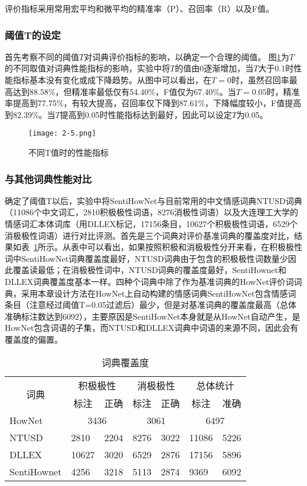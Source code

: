 评价指标采用常用宏平均和微平均的精准率（P）、召回率（R）以及F值。
\subsubsection{阈值T的设定}
首先考察不同的阈值$ T $对词典评价指标的影响，以确定一个合理的阈值。
图\ref{fig2-5}为$ T $的不同取值对词典性能指标的影响，实验中将$ T $的值由0逐渐增加，当$ T $大于0.1时性能指标基本没有变化或成下降趋势。从图中可以看出，在$ T=0 $时，虽然召回率最高达到88.58\%，但精准率最低仅有54.40\%，F值仅为67.40\%。当$ T=0.05 $时，精准率提高到77.75\%，有较大提高，召回率仅下降到87.61\%，下降幅度较小，F值提高到82.39\%。当$ T $提高到0.05时性能指标达到最好，因此可以设定$ T $为0.05。

\begin{figure}[htp]
\centering
\texttt{[image: 2-5.png]}
\caption{不同T值时的性能指标}
\label{fig2-5}
\end{figure}

\subsubsection{与其他词典性能对比}
确定了阈值T以后，实验中将SentiHowNet与目前常用的中文情感词典NTUSD词典（11086个中文词汇，2810积极极性词语，8276消极性词语）以及大连理工大学的情感词汇本体词库（用DLLEX标记，17156条目，10627个积极极性词语，6529个消极极性词语）进行对比评测。首先是三个词典对评价基准词典的覆盖度对比，结果如表~\ref{tab2-2}所示。从表中可以看出，如果按照积极和消极极性分开来看，在积极极性词中SentiHowNet词典覆盖度最好，NTUSD词典由于包含的积极极性词数量少因此覆盖读最低；在消极极性词中，NTUSD词典的覆盖度最好，SentiHownet和DLLEX词典覆盖度基本一样。四种个词典中除了作为基准词典的HowNet评价词词典，采用本章设计方法在HowNet上自动构建的情感词典SentiHowNet包含情感词条目（注意经过阈值T=0.05过滤后）最少，但是对基准词典的覆盖度最高（总体准确标注数达到6092），主要原因是SentiHowNet本身就是从HowNet自动产生，是HowNet包含词语的子集，而NTUSD和DLLEX词典中词语的来源不同，因此会有覆盖度的偏置。

\begin{table}[htp]
\centering
\caption{词典覆盖度}
\label{tab2-2}
\begin{tabular}{|l|l|l|l|l|l|l|}
\hline
\multicolumn{1}{|c|}{\multirow{2}{*}{词典}} & \multicolumn{2}{c|}{积极极性} & \multicolumn{2}{c|}{消极极性} & \multicolumn{2}{c|}{总体统计} \\ \cline{2-7} 
\multicolumn{1}{|c|}{} & \multicolumn{1}{c|}{标注} & \multicolumn{1}{c|}{正确} & \multicolumn{1}{c|}{标注} & \multicolumn{1}{c|}{正确} & \multicolumn{1}{c|}{标注} & \multicolumn{1}{c|}{准确} \\ \hline
HowNet & \multicolumn{2}{c|}{3436} & \multicolumn{2}{c|}{3061} & \multicolumn{2}{c|}{6497} \\ \hline
NTUSD & 2810 & 2204 & 8276 & 3022 & 11086 & 5226 \\ \hline
DLLEX & 10627 & 3020 & 6529 & 2876 & 17156 & 5896 \\ \hline
SentiHownet & 4256 & 3218 & 5113 & 2874 & 9369 & 6092 \\ \hline
\end{tabular}
\end{table}

